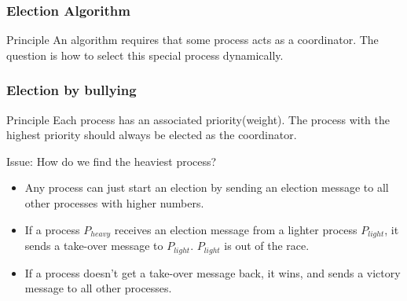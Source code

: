 \begin{frame}
    \frametitle{Election Algorithm}
\begin{block}{Principle}
    An algorithm requires that some process acts as a coordinator. The question is how to select this special process dynamically.
\end{block}

\end{frame}

\begin{frame}
    \frametitle{Election by bullying}
\begin{block}{Principle}
    Each process has an associated priority(weight). The process with the highest priority should always be elected as the coordinator.
\end{block}

\begin{block}{Issue: How do we find the heaviest process?}
    \begin{itemize}
        \item Any process can just start an election by sending an election message to all other processes with higher numbers.
        \item If a process $P_{heavy}$ receives an election message from a lighter process $P_{light}$, it sends a take-over message to $P_{light}$. $P_{light}$ is out of the race.
        \item If a process doesn't get a take-over message back, it wins, and sends a victory message to all other processes.
    \end{itemize}
\end{block}

\end{frame}

